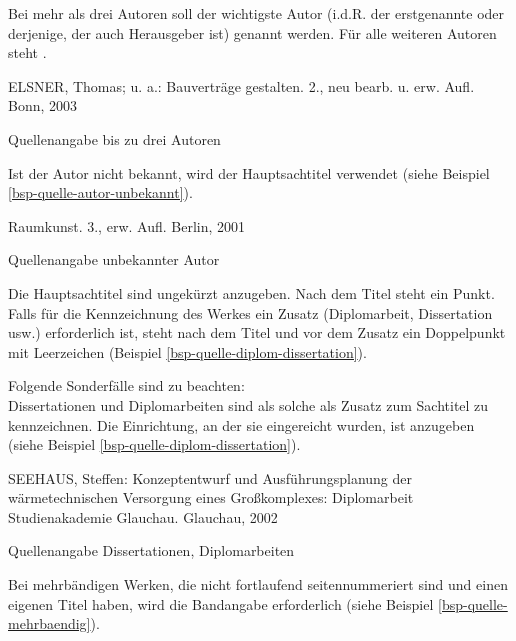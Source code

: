 Bei mehr als drei Autoren soll der wichtigste Autor (i.d.R. der erstgenannte oder derjenige, der auch Herausgeber ist) genannt werden.
Für alle weiteren Autoren steht .

\begin{example}[H]
    \begin{framed}
        ELSNER, Thomas; u. a.: Bauverträge gestalten. 2., neu bearb. u. erw. Aufl. Bonn, 2003
    \end{framed}
    \caption{Quellenangabe bis zu drei Autoren}
    \label{bsp-quelle-mehr-drei-autoren}
\end{example}

Ist der Autor nicht bekannt, wird der Hauptsachtitel verwendet (siehe Beispiel \ref{bsp-quelle-autor-unbekannt}).

\begin{example}[H]
    \begin{framed}
        Raumkunst. 3., erw. Aufl. Berlin, 2001
    \end{framed}
    \caption{Quellenangabe unbekannter Autor}
    \label{bsp-quelle-autor-unbekannt}
\end{example}

Die Hauptsachtitel sind ungekürzt anzugeben.
Nach dem Titel steht ein Punkt.
Falls für die Kennzeichnung des Werkes ein Zusatz (Diplomarbeit, Dissertation usw.) erforderlich ist, steht nach dem Titel und vor dem Zusatz ein Doppelpunkt mit Leerzeichen (Beispiel \ref{bsp-quelle-diplom-dissertation}).

Folgende Sonderfälle sind zu beachten:\\
Dissertationen und Diplomarbeiten sind als solche als Zusatz zum Sachtitel zu kennzeichnen.
Die Einrichtung, an der sie eingereicht wurden, ist anzugeben (siehe Beispiel \ref{bsp-quelle-diplom-dissertation}).

\begin{example}[H]
    \begin{framed}
        SEEHAUS, Steffen: Konzeptentwurf und Ausführungsplanung der wärmetechnischen Versorgung eines Großkomplexes: Diplomarbeit Studienakademie Glauchau. Glauchau, 2002
    \end{framed}
    \caption{Quellenangabe Dissertationen, Diplomarbeiten}
    \label{bsp-quelle-diplom-dissertation}
\end{example}

Bei mehrbändigen Werken, die nicht fortlaufend seitennummeriert sind und einen eigenen Titel haben, wird die Bandangabe erforderlich (siehe Beispiel \ref{bsp-quelle-mehrbaendig}).


